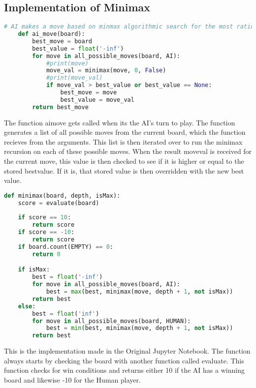 \subsection{Implementation of Minimax}
\label{subsec:Implementation of Minimax}
\begin{lstlisting}[language=python, caption={python example}, label={Script}, basicstyle=\ttfamily\small]
    # AI makes a move based on minmax algorithmic search for the most rational move to make
    def ai_move(board):
        best_move = board
        best_value = float('-inf')
        for move in all_possible_moves(board, AI):
            #print(move)
            move_val = minimax(move, 0, False)
            #print(move_val)
            if move_val > best_value or best_value == None:
                best_move = move
                best_value = move_val
        return best_move
\end{lstlisting}
The function ai\textunderscore move gets called when its the AI's turn to play. The function generates a list of all possible moves from the current board, 
which the function recieves from the arguments.
This list is then iterated over to run the minimax recursion on each of these possible moves.
When the result move\textunderscore val is received for the current move, this value is then checked to see if it is higher or equal to the stored best\textunderscore value. 
If it is, that stored value is then overridden with the new best value.
\begin{lstlisting}[language=python, caption={python example}, label={Script}, basicstyle=\ttfamily\small]
    def minimax(board, depth, isMax):
    score = evaluate(board)
    
    if score == 10: 
        return score
    if score == -10:
        return score
    if board.count(EMPTY) == 0:
        return 0

    if isMax:
        best = float('-inf')
        for move in all_possible_moves(board, AI):
            best = max(best, minimax(move, depth + 1, not isMax))
        return best
    else:
        best = float('inf')
        for move in all_possible_moves(board, HUMAN):
            best = min(best, minimax(move, depth + 1, not isMax))
        return best
\end{lstlisting}
This is the implementation made in the Original Jupyter Notebook. 
The function always starts by checking the board with another function called evaluate. 
This function checks for win conditions and returns either 10 if the AI has a winning board and likewise -10 for the Human player.
